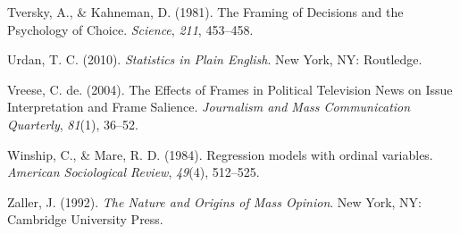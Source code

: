\documentclass[12pt,econ]{sources/authesis}
\begin{document}
\leavevmode\hypertarget{ref-tversky_framing_1981}{}%
Tversky, A., \& Kahneman, D. (1981). The Framing of Decisions and the Psychology of Choice. \emph{Science}, \emph{211}, 453--458.

\leavevmode\hypertarget{ref-urdan_statistics_2010}{}%
Urdan, T. C. (2010). \emph{Statistics in Plain English}. New York, NY: Routledge.

\leavevmode\hypertarget{ref-vreese_effects_2004}{}%
Vreese, C. de. (2004). The Effects of Frames in Political Television News on Issue Interpretation and Frame Salience. \emph{Journalism and Mass Communication Quarterly}, \emph{81}(1), 36--52.

\leavevmode\hypertarget{ref-winship_1984_regression}{}%
Winship, C., \& Mare, R. D. (1984). Regression models with ordinal variables. \emph{American Sociological Review}, \emph{49}(4), 512--525.

\leavevmode\hypertarget{ref-zaller_nature_1992}{}%
Zaller, J. (1992). \emph{The Nature and Origins of Mass Opinion}. New York, NY: Cambridge University Press.
\end{document}
